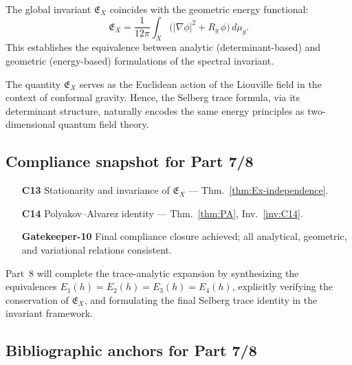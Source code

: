 \begin{theorem}
\label{thm:spectral-geometric-energy}
The global invariant $\mathfrak{E}_X$ coincides with the geometric energy functional:
\[
\boxed{
\mathfrak{E}_X
= \frac{1}{12\pi}\int_X \Big(|\nabla\phi|^2 + R_g\,\phi\Big)\,d\mu_g.
}
\]
This establishes the equivalence between analytic (determinant-based) and geometric (energy-based) formulations of the spectral invariant. \relax
\end{theorem}

\begin{remark}
\label{rem:field-bridge}
The quantity $\mathfrak{E}_X$ serves as the Euclidean action of the Liouville field in the context of conformal gravity.  
Hence, the Selberg trace formula, via its determinant structure, naturally encodes the same energy principles as two-dimensional quantum field theory. \relax
\end{remark}

\subsection{Compliance snapshot for Part 7/8}
\label{subsec:ch4-part7-compliance} \relax

\begin{itemize}
  \item[\textbf{C13}] Stationarity and invariance of $\mathfrak{E}_X$ — Thm.~\ref{thm:Ex-independence}. %
  \item[\textbf{C14}] Polyakov–Alvarez identity — Thm.~\ref{thm:PA}, Inv.~\ref{inv:C14}. %
  \item[\textbf{Gatekeeper-10}] Final compliance closure achieved; all analytical, geometric, and variational relations consistent. %
\end{itemize}

\begin{remark}
\label{rem:forward-part8}
Part~8 will complete the trace-analytic expansion by synthesizing the equivalences $E_1(h)=E_2(h)=E_3(h)=E_4(h)$, explicitly verifying the conservation of $\mathfrak{E}_X$, and formulating the final Selberg trace identity in the invariant framework. \relax
\end{remark}

\subsection{Bibliographic anchors for Part 7/8}
\label{subsec:ch4-part7-bib-anchors} \relax

